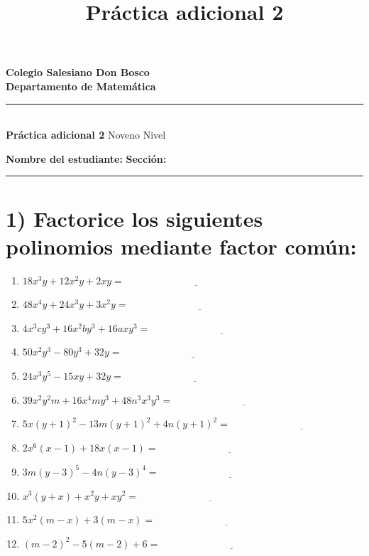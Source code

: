 \documentclass[11pt]{article}
\title{\textbf{Práctica adicional 2}}
\author{}
\date{}
\begin{document}
\thispagestyle{empty}

\begin{center}
    {\large \textbf{Colegio Salesiano Don Bosco}}\\[0.3em]
    {\large \textbf{Departamento de Matemática}}\\[0.3em]
    \rule{\textwidth}{0.4pt}\\[0.4em]
    {\large \textbf{Práctica adicional 2} \hfill Noveno Nivel}
\end{center}

\vspace{1.5em}

\noindent\textbf{Nombre del estudiante:} \underline{\hspace{6cm}} \qquad
\textbf{Sección:} \underline{\hspace{3cm}}

\vspace{1em}
\noindent\rule{\textwidth}{0.4pt}

\section*{1) Factorice los siguientes polinomios mediante factor común:}

\begin{enumerate}[label=\alph*),itemsep=1.2em,leftmargin=2em]
    \item $18x^{3}y + 12x^{2}y + 2xy = \underline{\hspace{6cm}}$
    \item $48x^{4}y + 24x^{3}y + 3x^{2}y = \underline{\hspace{6cm}}$
    \item $4x^{3}cy^{3} + 16x^{2}by^{3} + 16axy^{3} = \underline{\hspace{6cm}}$
    \item $50x^{2}y^{3} - 80y^{3} + 32y = \underline{\hspace{6cm}}$
    \item $24x^{3}y^{5} - 15xy + 32y = \underline{\hspace{6cm}}$
    \item $39x^{2}y^{2}m + 16x^{4}my^{3} + 48n^{3}x^{3}y^{3} = \underline{\hspace{6cm}}$
    \item $5x(y+1)^{2} - 13m(y+1)^{2} + 4n(y+1)^{2} = \underline{\hspace{6cm}}$
    \item $2x^{6}(x-1) + 18x(x-1) = \underline{\hspace{6cm}}$
    \item $3m(y-3)^{5} - 4n(y-3)^{4} = \underline{\hspace{6cm}}$
    \item $x^{3}(y+x) + x^{2}y + xy^{2} = \underline{\hspace{6cm}}$
    \item $5x^{2}(m-x) + 3(m-x) = \underline{\hspace{6cm}}$
    \item $(m-2)^{2} - 5(m-2) + 6 = \underline{\hspace{6cm}}$
\end{enumerate}
\end{document}
